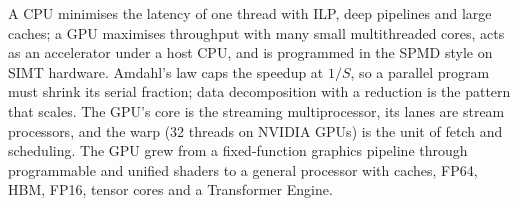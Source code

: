 \documentclass[../main.tex]{subfiles}
\begin{document}
\begin{keypoint}
  A CPU minimises the latency of one thread with ILP, deep pipelines
  and large caches; a GPU maximises throughput with many small
  multithreaded cores, acts as an accelerator under a host CPU, and is
  programmed in the SPMD style on SIMT hardware.  Amdahl's law caps the
  speedup at $1/S$, so a parallel program must shrink its serial
  fraction; data decomposition with a reduction is the pattern that
  scales.  The GPU's core is the streaming multiprocessor, its lanes
  are stream processors, and the warp (32 threads on NVIDIA GPUs) is the
  unit of fetch and scheduling.  The GPU grew from a fixed-function
  graphics pipeline through programmable and unified shaders to a
  general processor with caches, FP64, HBM, FP16, tensor cores and a
  Transformer Engine.
\end{keypoint}
\end{document}
